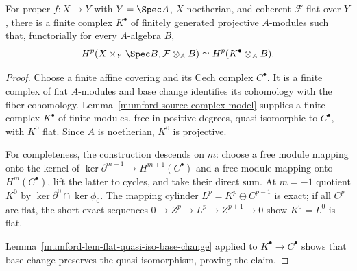 \begin{theorem}
\label{mumford-thm-grothendieck-complex}
For proper $f:X\to Y$ with $Y=\Spec A$, $X$ noetherian, and coherent
$\mathcal F$ flat over $Y$, there is a finite complex $K^\bullet$ of finitely generated
projective $A$-modules such that, functorially for every $A$-algebra $B$,
\[
 H^p(X\times_Y\Spec B,\mathcal F\otimes_A B)
 \simeq H^p(K^\bullet\otimes_A B).
\]
\end{theorem}
\begin{proof}
Choose a finite affine covering and its Cech complex $C^\bullet$. It is a
finite complex of flat $A$-modules and base change identifies its cohomology
with the fiber cohomology. Lemma~\ref{mumford-source-complex-model} supplies
a finite complex $K^\bullet$ of finite modules, free in positive degrees,
quasi-isomorphic to $C^\bullet$, with $K^0$ flat. Since $A$ is noetherian,
$K^0$ is projective.

For completeness, the construction descends on $m$: choose a free module
mapping onto the kernel of $\ker\partial^{m+1}\to H^{m+1}(C^\bullet)$ and a
free module mapping onto $H^m(C^\bullet)$, lift the latter to cycles, and
take their direct sum. At $m=-1$ quotient $K^0$ by
$\ker\partial^0\cap\ker\phi_0$. The mapping cylinder
$L^p=K^p\oplus C^{p-1}$ is exact; if all $C^p$ are flat, the short exact
sequences $0\to Z^p\to L^p\to Z^{p+1}\to0$ show $K^0=L^0$ is flat.

Lemma~\ref{mumford-lem-flat-quasi-iso-base-change} applied to $K^\bullet\to C^\bullet$
shows that base change preserves the quasi-isomorphism, proving the claim.
\end{proof}

